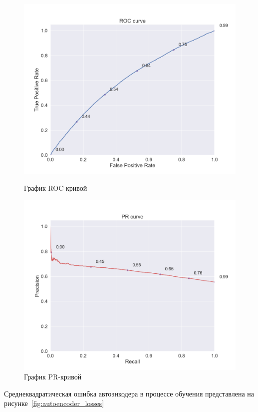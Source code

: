 \begin{figure}[h!]
\centering
\begin{minipage}{.5\textwidth}
\centering
\includegraphics[width=0.9\linewidth]{images/content/roc_curve}
\caption{График ROC-кривой}
\label{fig:content_roc}
\end{minipage}%
\begin{minipage}{.5\textwidth}
\centering
\includegraphics[width=0.9\linewidth]{images/content/pr_curve}
\caption{График PR-кривой}
\label{fig:content_pr}
\end{minipage}
\end{figure}

Среднеквадратическая ошибка автоэнкодера в процессе обучения представлена на рисунке~\ref{fig:autoencoder_losses}

